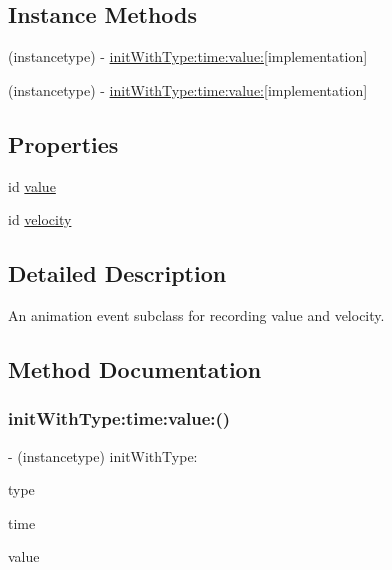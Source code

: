 \subsection*{Instance Methods}
\begin{DoxyCompactItemize}
\item 
(instancetype) -\/ \mbox{\hyperlink{interface_p_o_p_animation_value_event_aa7d1253db77e7cdf858b70871ea52831}{init\+With\+Type\+:time\+:value\+:}}{\ttfamily  \mbox{[}implementation\mbox{]}}
\item 
(instancetype) -\/ \mbox{\hyperlink{interface_p_o_p_animation_value_event_aa7d1253db77e7cdf858b70871ea52831}{init\+With\+Type\+:time\+:value\+:}}{\ttfamily  \mbox{[}implementation\mbox{]}}
\end{DoxyCompactItemize}
\subsection*{Properties}
\begin{DoxyCompactItemize}
\item 
id \mbox{\hyperlink{interface_p_o_p_animation_value_event_a2e41229523dda2e4f5f371c5e02a6ad8}{value}}
\item 
id \mbox{\hyperlink{interface_p_o_p_animation_value_event_ad41be3691cd1129438caf16255f90b6b}{velocity}}
\end{DoxyCompactItemize}


\subsection{Detailed Description}
An animation event subclass for recording value and velocity. 

\subsection{Method Documentation}
\mbox{\label{interface_p_o_p_animation_value_event_aa7d1253db77e7cdf858b70871ea52831}} 
\subsubsection{\texorpdfstring{init\+With\+Type\+:time\+:value\+:()}{initWithType:time:value:()}\hspace{0.1cm}{\footnotesize\ttfamily [1/2]}}
{\footnotesize\ttfamily -\/ (instancetype) init\+With\+Type\+: \begin{DoxyParamCaption}\item[{(P\+O\+P\+Animation\+Event\+Type)}]{type }\item[{time:(C\+F\+Time\+Interval)}]{time }\item[{value:(id)}]{value }\end{DoxyParamCaption}\hspace{0.3cm}{\ttfamily [implementation]}}

